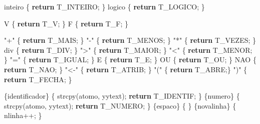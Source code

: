\documentclass[
  brazilian,
  letterpaper,
]{book}
\newenvironment{Shaded}{\begin{snugshade}}{\end{snugshade}}
\newcommand{\ControlFlowTok}[1]{\textcolor[rgb]{0.00,0.23,0.31}{\textbf{#1}}}
\newcommand{\NormalTok}[1]{\textcolor[rgb]{0.00,0.23,0.31}{#1}}
\newcommand{\OperatorTok}[1]{\textcolor[rgb]{0.37,0.37,0.37}{#1}}
\newcommand{\StringTok}[1]{\textcolor[rgb]{0.13,0.47,0.30}{#1}}
\theoremstyle{plain}
\theoremstyle{definition}
\theoremstyle{remark}
\begin{document}
\begin{Shaded}
\begin{Highlighting}[]
\NormalTok{inteiro           }\OperatorTok{\{} \ControlFlowTok{return}\NormalTok{ T\_INTEIRO}\OperatorTok{;} \OperatorTok{\}}
\NormalTok{logico            }\OperatorTok{\{} \ControlFlowTok{return}\NormalTok{ T\_LOGICO}\OperatorTok{;} \OperatorTok{\}}

\NormalTok{V                 }\OperatorTok{\{} \ControlFlowTok{return}\NormalTok{ T\_V}\OperatorTok{;} \OperatorTok{\}}
\NormalTok{F                 }\OperatorTok{\{} \ControlFlowTok{return}\NormalTok{ T\_F}\OperatorTok{;} \OperatorTok{\}}

\StringTok{"+"}               \OperatorTok{\{} \ControlFlowTok{return}\NormalTok{ T\_MAIS}\OperatorTok{;} \OperatorTok{\}}
\StringTok{"{-}"}               \OperatorTok{\{} \ControlFlowTok{return}\NormalTok{ T\_MENOS}\OperatorTok{;} \OperatorTok{\}}
\StringTok{"*"}               \OperatorTok{\{} \ControlFlowTok{return}\NormalTok{ T\_VEZES}\OperatorTok{;} \OperatorTok{\}}
\NormalTok{div               }\OperatorTok{\{} \ControlFlowTok{return}\NormalTok{ T\_DIV}\OperatorTok{;} \OperatorTok{\}}
\StringTok{"\textgreater{}"}               \OperatorTok{\{} \ControlFlowTok{return}\NormalTok{ T\_MAIOR}\OperatorTok{;} \OperatorTok{\}}
\StringTok{"\textless{}"}               \OperatorTok{\{} \ControlFlowTok{return}\NormalTok{ T\_MENOR}\OperatorTok{;} \OperatorTok{\}}
\StringTok{"="}               \OperatorTok{\{} \ControlFlowTok{return}\NormalTok{ T\_IGUAL}\OperatorTok{;} \OperatorTok{\}}
\NormalTok{E                 }\OperatorTok{\{} \ControlFlowTok{return}\NormalTok{ T\_E}\OperatorTok{;} \OperatorTok{\}}
\NormalTok{OU                }\OperatorTok{\{} \ControlFlowTok{return}\NormalTok{ T\_OU}\OperatorTok{;} \OperatorTok{\}}
\NormalTok{NAO               }\OperatorTok{\{} \ControlFlowTok{return}\NormalTok{ T\_NAO}\OperatorTok{;} \OperatorTok{\}}
\StringTok{"\textless{}{-}"}              \OperatorTok{\{} \ControlFlowTok{return}\NormalTok{ T\_ATRIB}\OperatorTok{;} \OperatorTok{\}}
\StringTok{"("}               \OperatorTok{\{} \ControlFlowTok{return}\NormalTok{ T\_ABRE}\OperatorTok{;\}}
\StringTok{")"}               \OperatorTok{\{} \ControlFlowTok{return}\NormalTok{ T\_FECHA}\OperatorTok{;} \OperatorTok{\}}

\OperatorTok{\{}\NormalTok{identificador}\OperatorTok{\}}   \OperatorTok{\{} 
\NormalTok{                     strcpy}\OperatorTok{(}\NormalTok{atomo}\OperatorTok{,}\NormalTok{ yytext}\OperatorTok{);}
                     \ControlFlowTok{return}\NormalTok{ T\_IDENTIF}\OperatorTok{;} 
                  \OperatorTok{\}}
\OperatorTok{\{}\NormalTok{numero}\OperatorTok{\}}          \OperatorTok{\{} 
\NormalTok{                     strcpy}\OperatorTok{(}\NormalTok{atomo}\OperatorTok{,}\NormalTok{ yytext}\OperatorTok{);}
                     \ControlFlowTok{return}\NormalTok{ T\_NUMERO}\OperatorTok{;} 
                  \OperatorTok{\}}
\OperatorTok{\{}\NormalTok{espaco}\OperatorTok{\}}          \OperatorTok{\{}  \OperatorTok{\}}
\OperatorTok{\{}\NormalTok{novalinha}\OperatorTok{\}}       \OperatorTok{\{}\NormalTok{  nlinha}\OperatorTok{++;} \OperatorTok{\}}


\end{Highlighting}
\end{Shaded}
\end{document}

